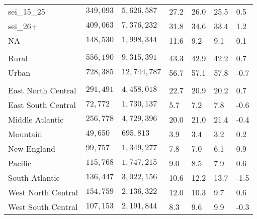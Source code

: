 \begin{longtable}{lllllll}
sei\_15\_25 & $349,093$ & $5,626,587$ & 27.2 & 26.0 & 25.5 & 0.5 \\ 
sei\_26+ & $409,063$ & $7,376,232$ & 31.8 & 34.6 & 33.4 & 1.2 \\ 
NA & $148,530$ & $1,998,344$ & 11.6 & 9.2 & 9.1 & 0.1 \\ 
\midrule\addlinespace[2.5pt]
\multicolumn{7}{l}{Rural} \\ 
\midrule\addlinespace[2.5pt]
Rural & $556,190$ & $9,315,391$ & 43.3 & 42.9 & 42.2 & 0.7 \\ 
Urban & $728,385$ & $12,744,787$ & 56.7 & 57.1 & 57.8 & -0.7 \\ 
\midrule\addlinespace[2.5pt]
\multicolumn{7}{l}{Region} \\ 
\midrule\addlinespace[2.5pt]
East North Central  & $291,491$ & $4,458,018$ & 22.7 & 20.9 & 20.2 & 0.7 \\ 
East South Central  & $72,772$ & $1,730,137$ & 5.7 & 7.2 & 7.8 & -0.6 \\ 
Middle Atlantic  & $256,778$ & $4,729,396$ & 20.0 & 21.0 & 21.4 & -0.4 \\ 
Mountain  & $49,650$ & $695,813$ & 3.9 & 3.4 & 3.2 & 0.2 \\ 
New England  & $99,757$ & $1,349,277$ & 7.8 & 7.0 & 6.1 & 0.9 \\ 
Pacific  & $115,768$ & $1,747,215$ & 9.0 & 8.5 & 7.9 & 0.6 \\ 
South Atlantic  & $136,447$ & $3,022,156$ & 10.6 & 12.2 & 13.7 & -1.5 \\ 
West North Central  & $154,759$ & $2,136,322$ & 12.0 & 10.3 & 9.7 & 0.6 \\ 
West South Central  & $107,153$ & $2,191,844$ & 8.3 & 9.6 & 9.9 & -0.3 \\ 
\bottomrule
\end{longtable}

